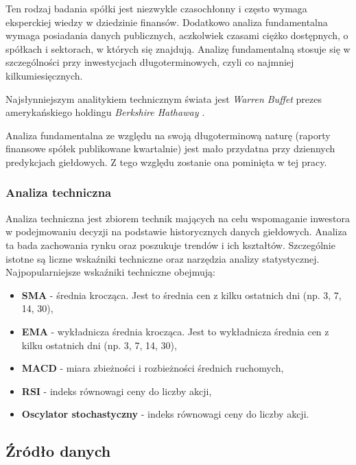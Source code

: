 \documentclass[a4paper, twoside, 11pt, openright]{article}
\begin{document}
Ten rodzaj badania spółki jest niezwykle czasochłonny i często wymaga eksperckiej wiedzy w dziedzinie finansów. Dodatkowo analiza fundamentalna wymaga posiadania danych publicznych, aczkolwiek czasami ciężko dostępnych, o spółkach i sektorach, w których się znajdują. Analizę fundamentalną stosuje się w szczególności przy inwestycjach długoterminowych, czyli co najmniej kilkumiesięcznych. 

Najsłynniejszym analitykiem technicznym świata jest \textit{Warren Buffet} prezes amerykańskiego holdingu \textit{Berkshire Hathaway \cite{berkeshire}}. 

\bigskip

Analiza fundamentalna ze względu na swoją długoterminową naturę (raporty finansowe spółek publikowane kwartalnie) jest mało przydatna przy dziennych predykcjach giełdowych. Z tego względu zostanie ona pominięta w tej pracy.

\subsubsection{Analiza techniczna \cite{technicalanalysis}}

Analiza techniczna jest zbiorem technik mających na celu wspomaganie inwestora w podejmowaniu decyzji na podstawie historycznych danych giełdowych. Analiza ta bada zachowania rynku oraz poszukuje trendów i ich kształtów. Szczególnie istotne są liczne wskaźniki techniczne oraz narzędzia analizy statystycznej.
Najpopularniejsze wskaźniki techniczne obejmują:
\begin{itemize}
\item{\textbf{SMA}} - średnia krocząca. Jest to średnia cen z kilku ostatnich dni (np. 3, 7, 14, 30),
\item{\textbf{EMA}} - wykładnicza średnia krocząca. Jest to wykładnicza średnia cen z kilku ostatnich dni (np. 3, 7, 14, 30),
\item{\textbf{MACD}} -  miara zbieżności i rozbieżności średnich ruchomych,
\item{\textbf{RSI}} -  indeks równowagi ceny do liczby akcji,
\item{\textbf{Oscylator stochastyczny}} -  indeks równowagi ceny do liczby akcji.
\end{itemize}

\subsection{Źródło danych}
\end{document}
